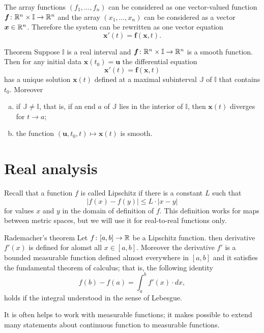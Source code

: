 The array functions $(f_1,\dots,f_n)$ can be considered as one vector-valued function 
$\bm{f}\colon\mathbb{R}^n\times \mathbb{I}\to \mathbb{R}^n$ and the array $(x_1,\dots,x_n)$ can be considered as a vector  $\bm{x}\in\mathbb{R}^n$.
Therefore the system can be rewritten as one vector equation 
\[\bm{x}'(t)=\bm{f}(\bm{x}, t).\] 

\begin{thm}{Theorem}\label{thm:ODE}
Suppose $\mathbb{I}$ is a real interval and $\bm{f}\colon\mathbb{R}^n\times\mathbb{I}\to \mathbb{R}^n$ is a smooth function.
Then for any initial data $\bm{x}(t_0)=\bm{u}$ the differential equation 
\[\bm{x}'(t)=\bm{f}(\bm{x},t)\]
has a unique solution $\bm{x}(t)$ defined at a maximal subinterval $\mathbb{J}$ of $\mathbb{I}$ that contains $t_0$.
Moreover
\begin{enumerate}[(a)]
\item  if $\mathbb{J}\ne \mathbb{I}$, that is, if an end $a$ of $\mathbb{J}$ lies in the interior of $\mathbb{I}$, then $\bm{x}(t)$ diverges for $t\to a$;
\item  the function $(\bm{u},t_0,t)\mapsto \bm{x}(t)$ is smooth.
\end{enumerate}


\end{thm}

\section{Real analysis}

Recall that a function $f$ is called Lipschitz if there is a constant $L$ such that 
\[|f(x)-f(y)|\le L\cdot|x-y|\]
for values $x$ and $y$ in the domain of definition of $f$.
This definition works for maps between metric spaces, but we will use it for real-to-real functions only.

\begin{thm}{Rademacher's theorem}\label{thm:rademacher}
Let $f\colon[a,b]\to\mathbb{R}$ be a Lipschitz function.
then derivative $f'(x)$ is defined for alomst all $x\in [a,b]$.
Moreover the derivative $f'$ is a bounded measurable function defined almost everywhere in $[a,b]$ and it satisfies the fundamental theorem of calculus; that is, the following identity 
\[f(b)-f(a)=\int_a^b f'(x)\cdot dx,\]
holds if the integral understood in the sense of Lebesgue.
\end{thm}

It is often helps to work with measurable functions; 
it makes possible to extend many statements about continuous function to measurable functions.

